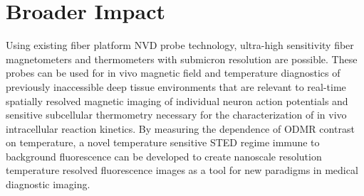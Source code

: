 \section{Broader Impact}
Using existing fiber platform NVD probe technology, ultra-high sensitivity fiber magnetometers and thermometers with submicron resolution are possible.  These probes can be used for in vivo magnetic field and temperature diagnostics of previously inaccessible deep tissue environments that are relevant to real-time spatially resolved magnetic imaging of individual neuron action potentials and sensitive subcellular thermometry necessary for the characterization of in vivo intracellular reaction kinetics.  By measuring the dependence of ODMR contrast on temperature, a novel temperature sensitive STED regime immune to background fluorescence can be developed to create nanoscale resolution temperature resolved fluorescence images as a tool for new paradigms in medical diagnostic imaging.